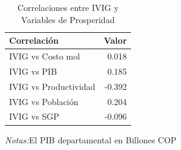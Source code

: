 \documentclass[12pt]{article}
\begin{document}
\setcounter{table}{5}
\begin{table}[htbp]
\centering
\begin{threeparttable}

\caption{Correlaciones entre IVIG y Variables de Prosperidad}
\begin{tabular}[t]{lr}
\toprule
Correlación & Valor\\
\midrule
IVIG vs Costo mol & 0.018\\
IVIG vs PIB & 0.185\\
IVIG vs Productividad & -0.392\\
IVIG vs Población & 0.204\\
IVIG vs SGP & -0.096\\
\bottomrule
\end{tabular}
\begin{tablenotes}
\footnotesize
\item \textit{Notas:}El PIB departamental en Billones COP
\end{tablenotes}
\end{threeparttable}
\end{table}
\end{document}
